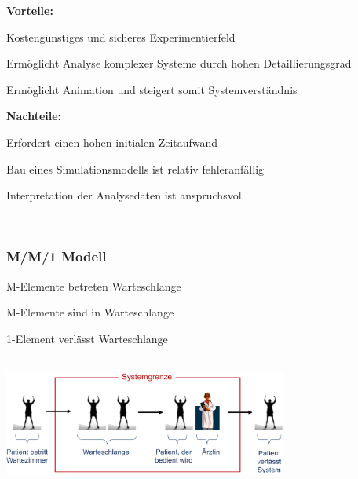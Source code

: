 \begin{multicols}{2}
	\textbf{Vorteile:}
	\begin{compactitem}
		\item Kostengünstiges und sicheres Experimentierfeld
		\item Ermöglicht Analyse komplexer Systeme durch hohen Detaillierungsgrad
		\item Ermöglicht Animation und steigert somit Systemverständnis
	\end{compactitem}
	\textbf{Nachteile:}
	\begin{compactitem}
		\item Erfordert einen hohen initialen Zeitaufwand
		\item Bau eines Simulationsmodells ist relativ fehleranfällig
		\item Interpretation der Analysedaten ist anspruchsvoll
	\end{compactitem} \ \\
\end{multicols}

\subsubsection{M/M/1 Modell}
\begin{multicols}{3}
	\begin{compactitem}[$\bullet$]
		\item M-Elemente betreten Warteschlange
		\item M-Elemente sind in Warteschlange
		\item 1-Element verlässt Warteschlange
	\end{compactitem}
\end{multicols}
\begin{example}\\
	\includegraphics[width=0.7\textwidth]{pictures/mm1modell}
\end{example}

